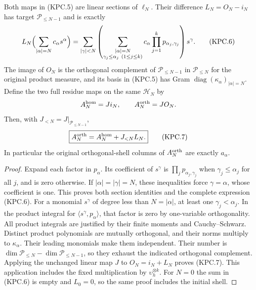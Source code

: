 \begin{theorem}
Both maps in (KPC.5) are linear sections of \(\ell_N\).
Their difference \(L_N=O_N-i_N\) has target
\(\mathcal P_{\le N-1}\) and is exactly
\[
 L_N\Bigl(\sum_{|\alpha|=N}c_\alpha s^\alpha\Bigr)
 =\sum_{|\gamma|<N}
   \left(\sum_{\substack{|\alpha|=N\\\gamma_j\le\alpha_j\ (1\le j\le k)}}
       c_\alpha\prod_{j=1}^k p_{\alpha_j,\gamma_j}\right)s^\gamma.
 \tag{KPC.6}
\]
The image of \(O_N\) is the orthogonal complement of
\(\mathcal P_{\le N-1}\) in \(\mathcal P_{\le N}\) for
the original product measure, and its basis in (KPC.5) has Gram
\(\operatorname{diag}(\kappa_\alpha)_{|\alpha|=N}\).
Define the two full residue maps on the same \(\mathcal H_N\) by
\[
 A_N^{\rm hom}=J i_N,\qquad A_N^{\rm orth}=J O_N.
\]
Then, with \(J_{<N}=J|_{\mathcal P_{\le N-1}}\),
\[
 \boxed{A_N^{\rm orth}=A_N^{\rm hom}+J_{<N}L_N.}
 \tag{KPC.7}
\]
In particular the original orthogonal-shell columns of
\(A_N^{\rm orth}\) are exactly \(a_\alpha\).
\end{theorem}

\begin{proof}
Expand each factor in \(p_\alpha\).  Its coefficient of
\(s^\gamma\) is \(\prod_jp_{\alpha_j,\gamma_j}\) when
\(\gamma_j\le\alpha_j\) for all \(j\), and is zero
otherwise.  If \(|\alpha|=|\gamma|=N\), these inequalities
force \(\gamma=\alpha\), whose coefficient is one.
This proves both section identities and the complete expression
(KPC.6).  For a monomial \(s^\gamma\) of degree less than
\(N=|\alpha|\), at least one \(\gamma_j<\alpha_j\).
In the product integral for
\(\langle s^\gamma,p_\alpha\rangle\), that factor is zero
by one-variable orthogonality.  All product integrals are justified
by their finite moments and Cauchy--Schwarz.  Distinct product
polynomials are mutually orthogonal, and their norms multiply to
\(\kappa_\alpha\).  Their leading monomials make them
independent.  Their number is
\(\dim\mathcal P_{\le N}-\dim\mathcal P_{\le N-1}\),
so they exhaust the indicated orthogonal complement.
Applying the unchanged linear map \(J\) to
\(O_N=i_N+L_N\) proves (KPC.7).  This application includes
the fixed multiplication by \(\upsilon_h^{\otimes k}\).
For \(N=0\) the sum in (KPC.6) is empty and \(L_0=0\),
so the same proof includes the initial shell.
\end{proof}

